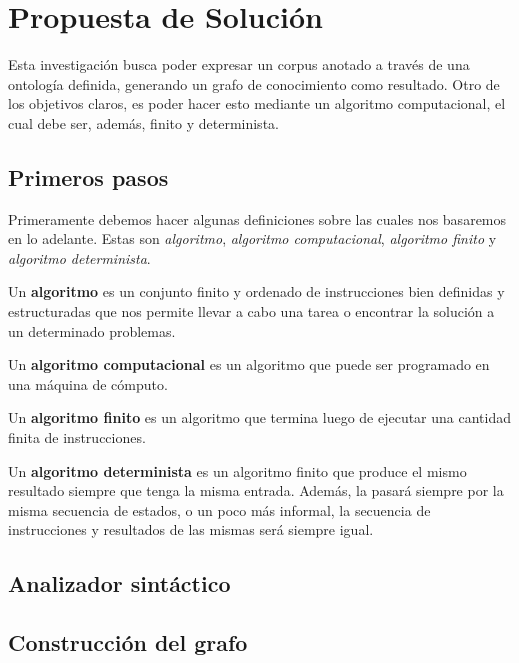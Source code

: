 \chapter{Propuesta de Solución}\label{chapter:proposed-solution}
Esta investigación busca poder expresar un corpus anotado a través de una ontología definida, generando un grafo de conocimiento como resultado. Otro de los objetivos claros, es poder hacer esto mediante un algoritmo computacional, el cual debe ser, además, finito y determinista. 


\section{Primeros pasos}
Primeramente debemos hacer algunas definiciones sobre las cuales nos basaremos en lo adelante. Estas son {\it algoritmo}, {\it algoritmo computacional}, {\it algoritmo finito} y {\it algoritmo determinista}.

\begin{definition}
	Un \textbf{algoritmo} es un conjunto finito y ordenado de instrucciones bien definidas y estructuradas que nos permite llevar a cabo una tarea o encontrar la solución a un determinado problemas.
\end{definition}

\begin{definition}
	Un \textbf{algoritmo computacional} es un algoritmo que puede ser programado en una máquina de cómputo.
\end{definition}

\begin{definition}
	Un \textbf{algoritmo finito} es un algoritmo que termina luego de ejecutar una cantidad finita de instrucciones.
\end{definition}

\begin{definition}
	Un \textbf{algoritmo determinista} es un algoritmo finito que produce el mismo resultado siempre que tenga la misma entrada. Además, la  pasará siempre por la misma secuencia de estados, o un poco más informal, la secuencia de instrucciones y resultados de las mismas será siempre igual.
\end{definition}

\section{Analizador sintáctico}

\section{Construcción del grafo}

\section{}